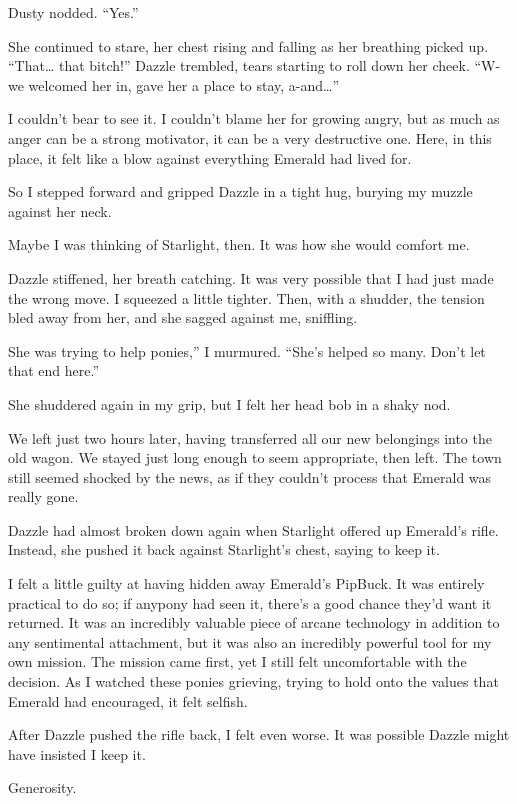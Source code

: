 Dusty nodded. “Yes.”

She continued to stare, her chest rising and falling as her breathing picked up. “That… that bitch!” Dazzle trembled, tears starting to roll down her cheek. “W-we welcomed her in, gave her a place to stay, a-and…”

I couldn’t bear to see it. I couldn’t blame her for growing angry, but as much as anger can be a strong motivator, it can be a very destructive one. Here, in this place, it felt like a blow against everything Emerald had lived for.

So I stepped forward and gripped Dazzle in a tight hug, burying my muzzle against her neck.

Maybe I was thinking of Starlight, then. It was how she would comfort me.

Dazzle stiffened, her breath catching. It was very possible that I had just made the wrong move. I squeezed a little tighter. Then, with a shudder, the tension bled away from her, and she sagged against me, sniffling.

\leavevmode{}She was trying to help ponies,” I murmured. “She’s helped so many. Don’t let that end here.”

She shuddered again in my grip, but I felt her head bob in a shaky nod.

{\br}%
We left just two hours later, having transferred all our new belongings into the old wagon. We stayed just long enough to seem appropriate, then left. The town still seemed shocked by the news, as if they couldn’t process that Emerald was really gone.

Dazzle had almost broken down again when Starlight offered up Emerald’s rifle. Instead, she pushed it back against Starlight’s chest, saying to keep it.

I felt a little guilty at having hidden away Emerald’s PipBuck. It was entirely practical to do so; if anypony had seen it, there’s a good chance they’d want it returned. It was an incredibly valuable piece of arcane technology in addition to any sentimental attachment, but it was also an incredibly powerful tool for my own mission. The mission came first, yet I still felt uncomfortable with the decision. As I watched these ponies grieving, trying to hold onto the values that Emerald had encouraged, it felt selfish.

After Dazzle pushed the rifle back, I felt even worse. It was possible Dazzle might have insisted I keep it.

Generosity.

